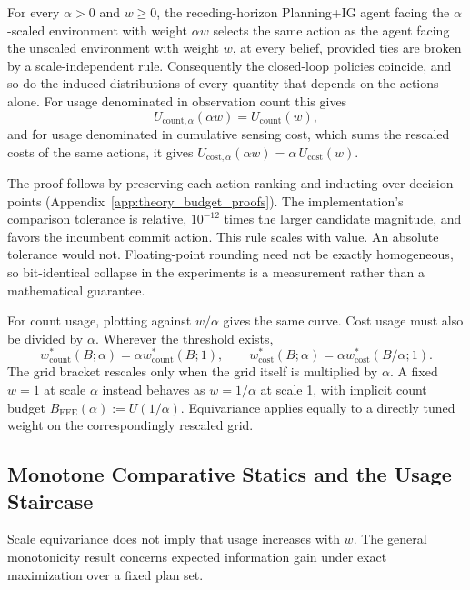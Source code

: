 \begin{proposition}
\label{prop:pi1}
For every $\alpha>0$ and $w \ge 0$, the receding-horizon Planning+IG agent facing the $\alpha$-scaled environment with weight $\alpha w$ selects the same action as the agent facing the unscaled environment with weight $w$, at every belief, provided ties are broken by a scale-independent rule. Consequently the closed-loop policies coincide, and so do the induced distributions of every quantity that depends on the actions alone. For usage denominated in observation count this gives
\begin{equation}
\label{eq:pi1}
U_{\mathrm{count},\alpha}(\alpha w) = U_{\mathrm{count}}(w),
\end{equation}
and for usage denominated in cumulative sensing cost, which sums the rescaled costs of the same actions, it gives $U_{\mathrm{cost},\alpha}(\alpha w) = \alpha\, U_{\mathrm{cost}}(w)$.
\end{proposition}

The proof follows by preserving each action ranking and inducting over decision points (Appendix~\ref{app:theory_budget_proofs}). The implementation's comparison tolerance is relative, $10^{-12}$ times the larger candidate magnitude, and favors the incumbent commit action. This rule scales with value. An absolute tolerance would not. Floating-point rounding need not be exactly homogeneous, so bit-identical collapse in the experiments is a measurement rather than a mathematical guarantee.

For count usage, plotting against $w/\alpha$ gives the same curve. Cost usage must also be divided by $\alpha$. Wherever the threshold exists,
\[
w^*_{\mathrm{count}}(B;\alpha)=\alpha w^*_{\mathrm{count}}(B;1),\qquad
w^*_{\mathrm{cost}}(B;\alpha)=\alpha w^*_{\mathrm{cost}}(B/\alpha;1).
\]
The grid bracket rescales only when the grid itself is multiplied by $\alpha$. A fixed $w=1$ at scale $\alpha$ instead behaves as $w=1/\alpha$ at scale 1, with implicit count budget $B_{\mathrm{EFE}}(\alpha):=U(1/\alpha)$. Equivariance applies equally to a directly tuned weight on the correspondingly rescaled grid.

\subsection{Monotone Comparative Statics and the Usage Staircase}
\label{sec:pi2}

Scale equivariance does not imply that usage increases with $w$. The general monotonicity result concerns expected information gain under exact maximization over a fixed plan set.

